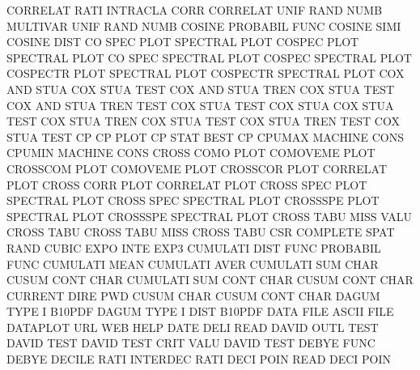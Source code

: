 CORRELAT RATI                           INTRACLA CORR
CORRELAT UNIF RAND NUMB                 MULTIVAR UNIF RAND NUMB
COSINE                                  PROBABIL FUNC
COSINE   SIMI                           COSINE   DIST
CO       SPEC PLOT                      SPECTRAL PLOT
COSPEC   PLOT                           SPECTRAL PLOT
CO       SPEC                           SPECTRAL PLOT
COSPEC                                  SPECTRAL PLOT
COSPECTR PLOT                           SPECTRAL PLOT
COSPECTR                                SPECTRAL PLOT
COX      AND  STUA                      COX      STUA TEST
COX      AND  STUA TREN                 COX      STUA TEST
COX      AND  STUA TREN TEST            COX      STUA TEST
COX      STUA                           COX      STUA TEST
COX      STUA TREN                      COX      STUA TEST
COX      STUA TREN TEST                 COX      STUA TEST
CP                                      CP       PLOT
CP       STAT                           BEST     CP
CPUMAX                                  MACHINE  CONS
CPUMIN                                  MACHINE  CONS
CROSS    COMO PLOT                      COMOVEME PLOT
CROSSCOM PLOT                           COMOVEME PLOT
CROSSCOR PLOT                           CORRELAT PLOT
CROSS    CORR PLOT                      CORRELAT PLOT
CROSS    SPEC PLOT                      SPECTRAL PLOT
CROSS    SPEC                           SPECTRAL PLOT
CROSSSPE PLOT                           SPECTRAL PLOT
CROSSSPE                                SPECTRAL PLOT
CROSS    TABU MISS VALU                 CROSS    TABU
CROSS    TABU MISS                      CROSS    TABU
CSR                                     COMPLETE SPAT RAND
CUBIC    EXPO INTE                      EXP3
CUMULATI DIST FUNC                      PROBABIL FUNC
CUMULATI MEAN                           CUMULATI AVER
CUMULATI SUM  CHAR                      CUSUM    CONT CHAR
CUMULATI SUM  CONT CHAR                 CUSUM    CONT CHAR
CURRENT  DIRE                           PWD
CUSUM    CHAR                           CUSUM    CONT CHAR
DAGUM    TYPE I                         B10PDF
DAGUM    TYPE I    DIST                 B10PDF
DATA     FILE                           ASCII    FILE
DATAPLOT URL                            WEB      HELP
DATE     DELI                           READ
DAVID    OUTL TEST                      DAVID    TEST
DAVID    TEST CRIT VALU                 DAVID    TEST
DEBYE    FUNC                           DEBYE
DECILE   RATI                           INTERDEC RATI
DECI     POIN                           READ     DECI POIN 
